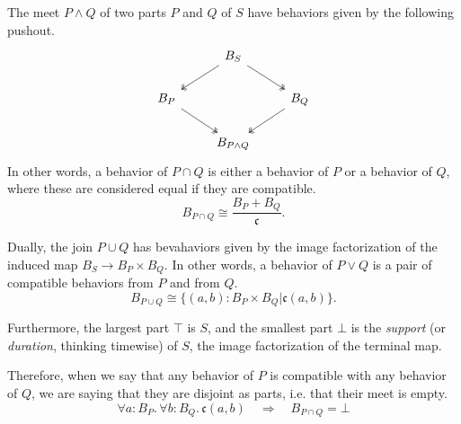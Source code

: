 \begin{claim}
The meet $P \wedge Q$ of two parts $P$ and $Q$ of $S$ have behaviors given by the following pushout.
\[
\begin{tikzcd}
 & B_S \arrow[ld, two heads] \arrow[rd, two heads] &  \\
B_P \arrow[rd, two heads] &  & B_Q \arrow[ld, two heads] \\
 & B_{P \wedge Q} & 
\end{tikzcd}
\]
In other words, a behavior of $P \cap Q$ is either a behavior of $P$ or a behavior of $Q$, where these are considered equal if they are compatible.
$$B_{P \cap Q} \cong \frac{B_P + B_Q}{\mathfrak{c}}.$$

Dually, the join $P \cup Q$ has bevahaviors given by the image factorization of the induced map $B_S \to B_P \times B_Q$. In other words, a behavior of $P \vee Q$ is a pair of compatible behaviors from $P$ and from $Q$.
$$B_{P \cup Q} \cong \{(a, b) : B_P \times B_Q | \mathfrak{c}(a, b)\}.$$

Furthermore, the largest part $\top$ is $S$, and the smallest part $\bot$ is the \emph{support} (or \emph{duration}, thinking timewise) of $S$, the image factorization of the terminal map.
\end{claim}

Therefore, when we say that any behavior of $P$ is compatible with any behavior of $Q$, we are saying that they are disjoint as parts, i.e. that their meet is empty.
$$\forall a : B_P.\, \forall b : B_Q.\, \mathfrak{c}(a, b) \quad\Rightarrow\quad B_{P \cap Q} = \bot$$

